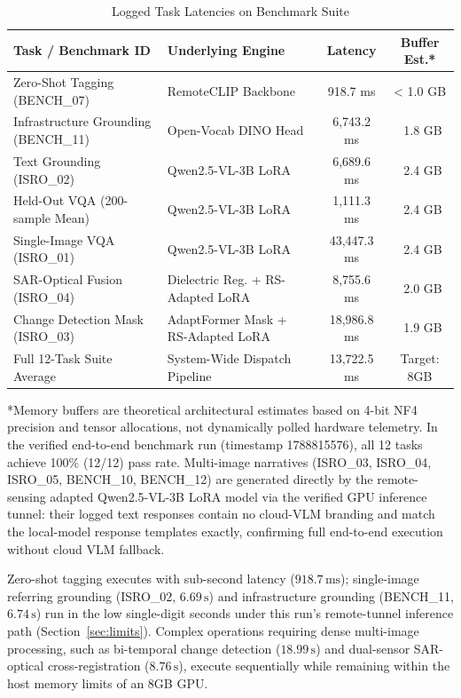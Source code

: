 \documentclass[lettersize,journal]{IEEEtran}
\begin{document}
\begin{table}[h]
\centering
\caption{Logged Task Latencies on Benchmark Suite}
\label{tab_hw}
\begin{tabular}{llcc}
\toprule
\textbf{Task / Benchmark ID} & \textbf{Underlying Engine} & \textbf{Latency} & \textbf{Buffer Est.*} \\
\midrule
Zero-Shot Tagging (BENCH\_07) & RemoteCLIP Backbone & 918.7 ms & < 1.0 GB \\
Infrastructure Grounding (BENCH\_11) & Open-Vocab DINO Head & 6,743.2 ms & ~1.8 GB \\
Text Grounding (ISRO\_02) & Qwen2.5-VL-3B LoRA & 6,689.6 ms & ~2.4 GB \\
Held-Out VQA (200-sample Mean)& Qwen2.5-VL-3B LoRA & 1,111.3 ms & ~2.4 GB \\
Single-Image VQA (ISRO\_01) & Qwen2.5-VL-3B LoRA & 43,447.3 ms & ~2.4 GB \\
SAR-Optical Fusion (ISRO\_04) & Dielectric Reg. + RS-Adapted LoRA & 8,755.6 ms & ~2.0 GB \\
Change Detection Mask (ISRO\_03) & AdaptFormer Mask + RS-Adapted LoRA & 18,986.8 ms & ~1.9 GB \\
\midrule
Full 12-Task Suite Average & System-Wide Dispatch Pipeline & 13,722.5 ms & Target: 8GB \\
\bottomrule
\end{tabular}
\vspace{1mm}
\raggedright \footnotesize{*Memory buffers are theoretical architectural estimates based on 4-bit NF4 precision and tensor allocations, not dynamically polled hardware telemetry. In the verified end-to-end benchmark run (timestamp 1788815576), all 12 tasks achieve 100\% (12/12) pass rate. Multi-image narratives (ISRO\_03, ISRO\_04, ISRO\_05, BENCH\_10, BENCH\_12) are generated directly by the remote-sensing adapted Qwen2.5-VL-3B LoRA model via the verified GPU inference tunnel: their logged text responses contain no cloud-VLM branding and match the local-model response templates exactly, confirming full end-to-end execution without cloud VLM fallback.}
\end{table}

Zero-shot tagging executes with sub-second latency ($918.7\,\text{ms}$); single-image referring grounding (ISRO\_02, $6.69\,\text{s}$) and infrastructure grounding (BENCH\_11, $6.74\,\text{s}$) run in the low single-digit seconds under this run's remote-tunnel inference path (Section~\ref{sec:limits}). Complex operations requiring dense multi-image processing, such as bi-temporal change detection ($18.99\,\text{s}$) and dual-sensor SAR-optical cross-registration ($8.76\,\text{s}$), execute sequentially while remaining within the host memory limits of an 8GB GPU.
\end{document}
